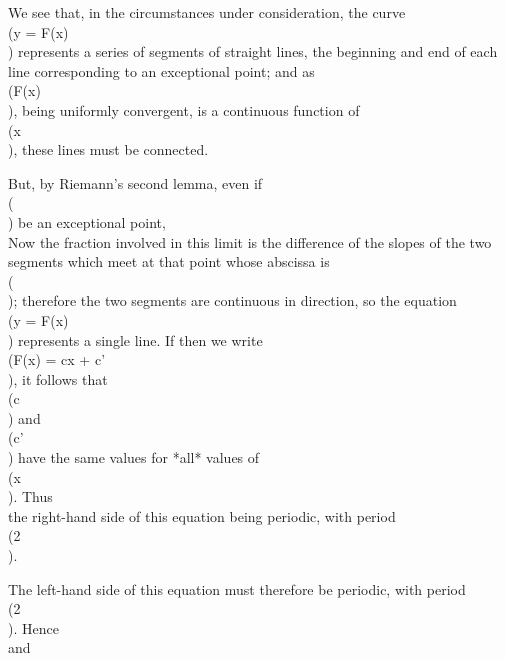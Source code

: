 We see that, in the circumstances under consideration, the curve \\(y = F(x)\\)
represents a series of segments of straight lines, the beginning
and end of each line corresponding to an exceptional point; and as \\(F(x)\\),
being uniformly convergent, is a continuous function of \\(x\\), these
lines must be connected.

But, by Riemann's second lemma, even if \\(\xi\\) be an exceptional point,
\\[ 
\lim_{\alpha \rightarrow 0}
\frac{F(\xi + \alpha) + F(\xi - \alpha) - 2F(\xi)}{\alpha}
=
0.
\\] 

Now the fraction involved in this limit is the difference of the
slopes of the two segments which meet at that point whose abscissa is
\\(\xi\\); therefore the two segments are continuous in direction, so the
equation \\(y = F(x)\\) represents a single line. If then we write
\\(F(x) = cx + c'\\), it follows that \\(c\\) and \\(c'\\) have the same values for
*all* values of \\(x\\). Thus
\\[ 
\frac{1}{2} A_{0} x^{2} - cx - c'
=
\sum_{n=1}^{\infty} n^{-2} A_{n}(x),
\\] 
the right-hand side of this equation being periodic, with period \\(2\pi\\).

The left-hand side of this equation must therefore be periodic, with
period \\(2\pi\\). Hence
\\[ 
A_{0} = 0,
\quad
c = 0,
\\] 
and
\\[ 
-c' = \sum_{n=1}^{\infty} n^{-2} A_{n}(x).
\\] 

